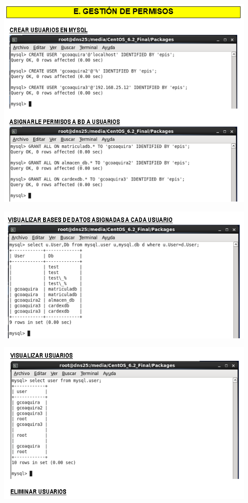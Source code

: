 \begin{itemize}
	\begin{center}
		\includegraphics[width=13cm]{./Imagenes/18a}
		\end{center}
\end{itemize} 

\begin{itemize}
	\begin{center}
		\includegraphics[width=13cm]{./Imagenes/19a}
		\end{center}
\end{itemize} 

\begin{itemize}
	\begin{center}
		\includegraphics[width=13cm]{./Imagenes/20a}
		\end{center}
\end{itemize} 

